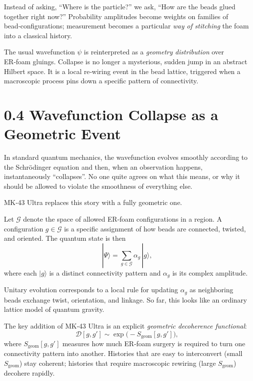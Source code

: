 Instead of asking, ``Where is the particle?'' we ask, ``How are the beads glued together right now?'' Probability amplitudes become weights on families of bead‑configurations; measurement becomes a particular \emph{way of stitching} the foam into a classical history.

The usual wavefunction $\psi$ is reinterpreted as a \emph{geometry distribution} over ER‑foam gluings. Collapse is no longer a mysterious, sudden jump in an abstract Hilbert space. It is a local re‑wiring event in the bead lattice, triggered when a macroscopic process pins down a specific pattern of connectivity.

\section*{0.4 Wavefunction Collapse as a Geometric Event}

In standard quantum mechanics, the wavefunction evolves smoothly according to the Schrödinger equation and then, when an observation happens, instantaneously ``collapses''. No one quite agrees on what this means, or why it should be allowed to violate the smoothness of everything else.

MK‑43 Ultra replaces this story with a fully geometric one.

Let $\mathcal{G}$ denote the space of allowed ER‑foam configurations in a region. A configuration $g \in \mathcal{G}$ is a specific assignment of how beads are connected, twisted, and oriented. The quantum state is then
\begin{equation}
|\Psi\rangle = \sum_{g \in \mathcal{G}} \alpha_g \, |g\rangle,
\end{equation}
where each $|g\rangle$ is a distinct connectivity pattern and $\alpha_g$ is its complex amplitude.

Unitary evolution corresponds to a local rule for updating $\alpha_g$ as neighboring beads exchange twist, orientation, and linkage. So far, this looks like an ordinary lattice model of quantum gravity.

The key addition of MK‑43 Ultra is an explicit \emph{geometric decoherence functional}:
\begin{equation}
\mathcal{D}[g, g'] \sim \exp\!\big( - S_{\text{geom}}[g, g'] \big),
\end{equation}
where $S_{\text{geom}}[g, g']$ measures how much ER‑foam surgery is required to turn one connectivity pattern into another. Histories that are easy to interconvert (small $S_{\text{geom}}$) stay coherent; histories that require macroscopic rewiring (large $S_{\text{geom}}$) decohere rapidly.

